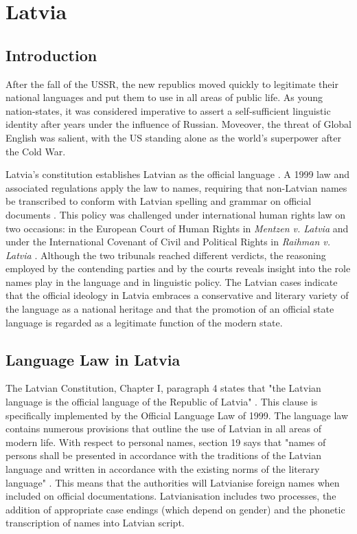 \section{Latvia}

\subsection{Introduction}

After the fall of the USSR, the new republics moved quickly to legitimate their
national languages and put them to use in all areas of public life. As young
nation-states, it was considered imperative to assert a self-sufficient
linguistic identity after years under the influence of Russian. Moveover, the
threat of Global English was salient, with the US standing alone as the world's
superpower after the Cold War.

Latvia's constitution establishes Latvian as the official language
\parencite{lat-const}. A 1999 law and associated regulations apply the law to
names, requiring that non-Latvian names be transcribed to conform with Latvian
spelling and grammar on official documents \parencite{lat-lang}. This policy was challenged under
international human rights law on two occasions: in the European Court of Human
Rights in \textit{Mentzen v. Latvia} \parencite{mentzen04} and under the
International Covenant of Civil and Political Rights in \textit{Raihman v.
Latvia} \parencite{raihman10}. Although the two tribunals reached different
verdicts, the reasoning employed by the contending parties and by the courts
reveals insight into the role names play in the language and in linguistic
policy. The Latvian cases indicate that the official ideology in Latvia
embraces a conservative and literary variety of the language as a national
heritage and that the promotion of an official state language is regarded as a
legitimate function of the modern state.

\subsection{Language Law in Latvia}

The Latvian Constitution, Chapter I, paragraph 4 states that "the Latvian
language is the official language of the Republic of Latvia"
\parencite{lat-const}. This clause is specifically implemented by the Official
Language Law of 1999. The language law contains numerous provisions that
outline the use of Latvian in all areas of modern life. With respect to
personal names, section 19 says that "names of persons shall be presented in
accordance with the traditions of the Latvian language and written in
accordance with the existing norms of the literary language"
\parencite{lat-lang}. This means that the authorities will Latvianise foreign
names when included on official documentations. Latvianisation includes two
processes, the addition of appropriate case endings (which depend on gender)
and the phonetic transcription of names into Latvian script.

